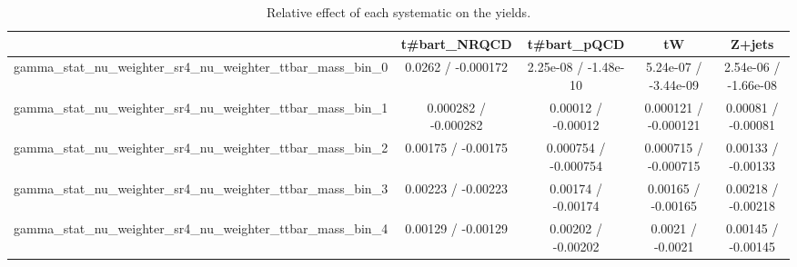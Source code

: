 \documentclass[10pt]{article}
\begin{document}
\begin{table}[htbp]
\begin{center}
\begin{tabular}{|c|c|c|c|c|}
\hline 
      & t#bar{t}_{NRQCD}      & t#bar{t}_{pQCD}      & tW      & Z+jets \\ 
\hline 
  gamma_stat_nu_weighter_sr4_nu_weighter_ttbar_mass_bin_0 & 0.0262 / -0.000172 & 2.25e-08 / -1.48e-10 & 5.24e-07 / -3.44e-09 & 2.54e-06 / -1.66e-08 \\ 
  gamma_stat_nu_weighter_sr4_nu_weighter_ttbar_mass_bin_1 & 0.000282 / -0.000282 & 0.00012 / -0.00012 & 0.000121 / -0.000121 & 0.00081 / -0.00081 \\ 
  gamma_stat_nu_weighter_sr4_nu_weighter_ttbar_mass_bin_2 & 0.00175 / -0.00175 & 0.000754 / -0.000754 & 0.000715 / -0.000715 & 0.00133 / -0.00133 \\ 
  gamma_stat_nu_weighter_sr4_nu_weighter_ttbar_mass_bin_3 & 0.00223 / -0.00223 & 0.00174 / -0.00174 & 0.00165 / -0.00165 & 0.00218 / -0.00218 \\ 
  gamma_stat_nu_weighter_sr4_nu_weighter_ttbar_mass_bin_4 & 0.00129 / -0.00129 & 0.00202 / -0.00202 & 0.0021 / -0.0021 & 0.00145 / -0.00145 \\ 
\hline 
\end{tabular} 
\caption{Relative effect of each systematic on the yields.} 
\end{center} 
\end{table} 
\end{document}
